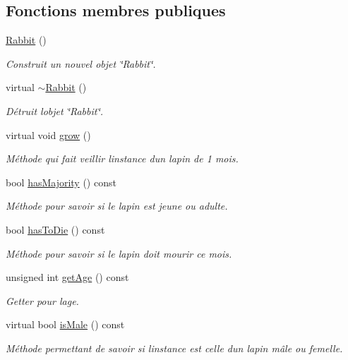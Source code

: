 \subsection*{Fonctions membres publiques}
\begin{DoxyCompactItemize}
\item 
\hyperlink{classRabbit_ae2093988d2ba8f561213a9767e8a31dd}{Rabbit} ()
\begin{DoxyCompactList}\small\item\em Construit un nouvel objet \char`\"{}\+Rabbit\char`\"{}. \end{DoxyCompactList}\item 
virtual \hyperlink{classRabbit_ac57586ffc31fffa6392638afbbd32774}{$\sim$\+Rabbit} ()
\begin{DoxyCompactList}\small\item\em Détruit l\textquotesingle{}objet \char`\"{}\+Rabbit\char`\"{}. \end{DoxyCompactList}\item 
virtual void \hyperlink{classRabbit_a404af8877c99ddc98108d88c8e466013}{grow} ()
\begin{DoxyCompactList}\small\item\em Méthode qui fait veillir l\textquotesingle{}instance d\textquotesingle{}un lapin de 1 mois. \end{DoxyCompactList}\item 
bool \hyperlink{classRabbit_a8087ee3ab0acaa6108e6982933b0f79a}{has\+Majority} () const
\begin{DoxyCompactList}\small\item\em Méthode pour savoir si le lapin est jeune ou adulte. \end{DoxyCompactList}\item 
bool \hyperlink{classRabbit_a82cf75bd520aaa775fadbf103fc12499}{has\+To\+Die} () const
\begin{DoxyCompactList}\small\item\em Méthode pour savoir si le lapin doit mourir ce mois. \end{DoxyCompactList}\item 
unsigned int \hyperlink{classRabbit_ab34450717cf7b3f9eb22747527c34922}{get\+Age} () const
\begin{DoxyCompactList}\small\item\em Getter pour l\textquotesingle{}age. \end{DoxyCompactList}\item 
virtual bool \hyperlink{classRabbit_a913437a589519afdb9249825bd6f03bd}{is\+Male} () const
\begin{DoxyCompactList}\small\item\em Méthode permettant de savoir si l\textquotesingle{}instance est celle d\textquotesingle{}un lapin mâle ou femelle. \end{DoxyCompactList}\end{DoxyCompactItemize}
